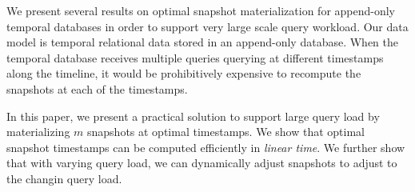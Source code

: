 We present several results on optimal snapshot materialization
for append-only temporal databases in order to support very large
scale query workload.  Our data model is temporal relational data
stored in an append-only database. When the temporal database receives
multiple queries querying at different timestamps along the timeline, it
would be prohibitively expensive to recompute the snapshots at each
of the timestamps.

In this paper, we present a practical solution to support large query load
by materializing $m$ snapshots at optimal timestamps.  We show that optimal
snapshot timestamps can be computed efficiently in {\em linear time}.
We further show that with varying query load, we can dynamically adjust
snapshots to adjust to the changin query load.

